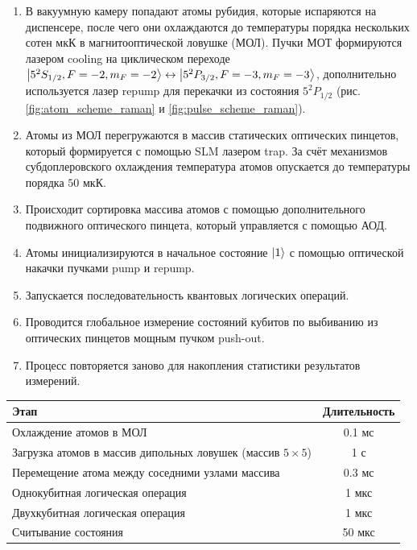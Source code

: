 \begin{enumerate}
	\item В вакуумную камеру попадают атомы рубидия, которые испаряются на диспенсере, после чего они охлаждаются до температуры порядка нескольких сотен мкК в магнитооптической ловушке (МОЛ). Пучки МОТ формируются лазером cooling на циклическом переходе $\left| 5^2S_{1/2},F=-2,m_F=-2 \right\rangle\leftrightarrow \left| 5^2P_{3/2},F=-3,m_F=-3 \right\rangle$, дополнительно используется лазер repump для перекачки из состояния $5^2P_{1/2}$ (рис. \ref{fig:atom_scheme_raman} и \ref{fig:pulse_scheme_raman}). 
	\item Атомы из МОЛ перегружаются в массив статических оптических пинцетов, который формируется с помощью SLM лазером trap. За счёт механизмов субдоплеровского охлаждения температура атомов опускается до температуры порядка $50 \text{ мкК}$.
	\item Происходит сортировка массива атомов с помощью дополнительного подвижного оптического пинцета, который управляется с помощью АОД.
	\item Атомы инициализируются в начальное состояние $\left| 1 \right\rangle$ с помощью оптической накачки пучками pump и repump.
	\item Запускается последовательность квантовых логических операций. 
	\item Проводится глобальное измерение состояний кубитов по выбиванию из оптических пинцетов мощным пучком push-out.
	\item Процесс повторяется заново для накопления статистики результатов измерений.
\end{enumerate}

\vspace{2em}

\begin{center}
	\begin{tabular}{ |p{13cm}|c| } 
	  \hline
	  \textbf{Этап} & \textbf{Длительность} \\ 
	  \hline
	  Охлаждение атомов в МОЛ 							& 0.1 мс \\ 
	  Загрузка атомов в массив дипольных ловушек (массив $5 \times 5$)    & 1 с \\
	  Перемещение атома между соседними узлами массива  & 0.3 мс \\ 
	  Однокубитная логическая операция   				& 1 мкс \\
	  Двухкубитная логическая операция  				& 1 мкс \\
	  Считывание состояния 								& 50 мкс \\ 
	  \hline
	\end{tabular}
	\label{tab:times}
\end{center}

